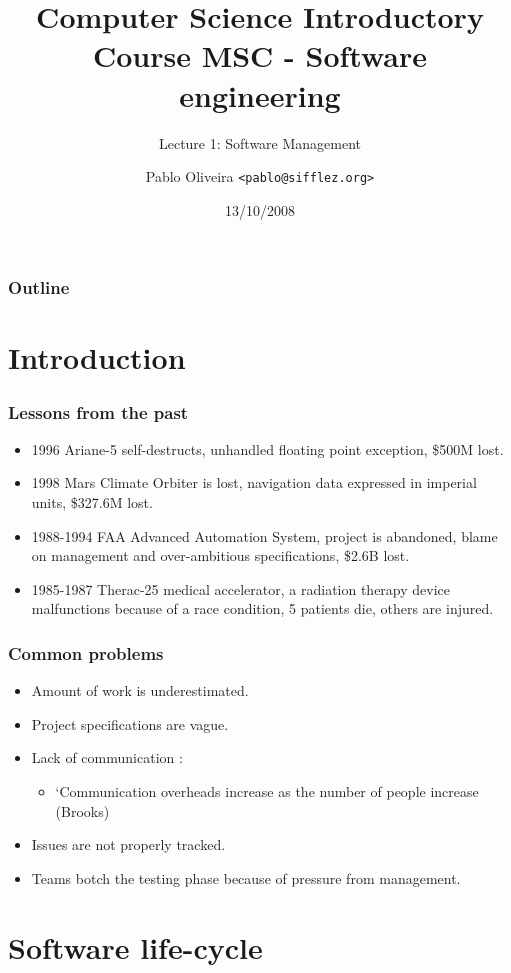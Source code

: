\documentclass[10pt]{beamer}
\title{Computer Science Introductory Course MSC - Software engineering}
\subtitle{Lecture 1: Software Management}
\author[Pablo Oliveira]{Pablo Oliveira \texttt{<pablo@sifflez.org>}}
\institute{ENST}
\date{13/10/2008}
\begin{document}
\begin{frame}
  \titlepage
\end{frame}

\begin{frame}
  \frametitle{Outline}
  \tableofcontents
\end{frame}

\section{Introduction}
\begin{frame}[fragile]
  \frametitle{Lessons from the past}
  \begin{itemize}
  \item 1996 Ariane-5 self-destructs, unhandled floating point exception,
    \$500M lost.
  \item 1998 Mars Climate Orbiter is lost, navigation data expressed in imperial
    units, \$327.6M lost.
  \item 1988-1994 FAA Advanced Automation System, project is abandoned, blame
    on management and over-ambitious specifications, \$2.6B lost.
  \item 1985-1987 Therac-25 medical accelerator, a radiation therapy device
    malfunctions because of a race condition, 5 patients die, others are injured.
  \end{itemize}
\end{frame}

\begin{frame}[fragile]
  \frametitle{Common problems}
  \begin{itemize}
  \item Amount of work is underestimated.
  \item Project specifications are vague.
  \item Lack of communication :
    \begin{itemize}
    \item `Communication overheads increase as the number of people increase
      (Brooks)
    \end{itemize}
  \item Issues are not properly tracked.
  \item Teams botch the testing phase because of pressure from management.
  \end{itemize}
\end{frame}

\section{Software life-cycle}
\end{document}
